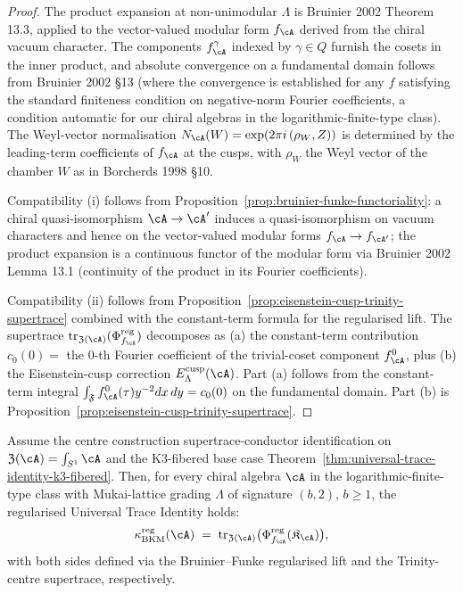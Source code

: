 \begin{proof}
The product expansion at non-unimodular $\Lambda$ is Bruinier 2002
Theorem 13.3, applied to the vector-valued modular form $f_\cA$ derived
from the chiral vacuum character. The components $f_\cA^\gamma$ indexed
by $\gamma \in Q$ furnish the cosets in the inner product, and
absolute convergence on a fundamental domain follows from Bruinier
2002 \S 13 \textup{(}where the convergence is established for any
$f$ satisfying the standard finiteness condition on negative-norm
Fourier coefficients, a condition automatic for our chiral algebras
in the logarithmic-finite-type class\textup{).} The Weyl-vector
normalisation $N_\cA(W) = \exp(2\pi i\,(\rho_W, Z))$ is determined by
the leading-term coefficients of $f_\cA$ at the cusps, with $\rho_W$
the Weyl vector of the chamber $W$ as in Borcherds 1998 \S 10.

Compatibility (i) follows from
Proposition~\ref{prop:bruinier-funke-functoriality}: a chiral
quasi-isomorphism $\cA \to \cA'$ induces a quasi-isomorphism on vacuum
characters and hence on the vector-valued modular forms
$f_\cA \to f_{\cA'}$; the product expansion is a continuous functor of
the modular form via Bruinier 2002 Lemma 13.1 \textup{(}continuity of
the product in its Fourier coefficients\textup{).}

Compatibility (ii) follows from
Proposition~\ref{prop:eisenstein-cusp-trinity-supertrace} combined with
the constant-term formula for the regularised lift. The supertrace
$\mathrm{tr}_{\mathfrak{Z}(\cA)}(\Phi^{\mathrm{reg}}_{f_\cA})$
decomposes as (a) the constant-term contribution
$c_0(0) = $ the $0$-th Fourier coefficient of the trivial-coset
component $f_\cA^0$, plus (b) the Eisenstein-cusp correction
$E_\Lambda^{\mathrm{cusp}}(\cA)$. Part (a) follows from the
constant-term integral $\int_{\mathfrak{F}} f_\cA^0(\tau) y^{-2} dx \, dy = c_0(0)$
on the fundamental domain. Part (b) is
Proposition~\ref{prop:eisenstein-cusp-trinity-supertrace}.
\end{proof}

\begin{theorem}
\label{thm:universal-trace-identity-non-k3-fibered}
Assume the centre construction supertrace-conductor identification on
$\mathfrak{Z}(\cA) = \int_{S^1}\cA$ and the K$3$-fibered base case
Theorem~\ref{thm:universal-trace-identity-k3-fibered}. Then, for every
chiral algebra $\cA$ in the logarithmic-finite-type class with
Mukai-lattice grading $\Lambda$ of signature $(b, 2)$, $b \ge 1$, the
regularised Universal Trace Identity holds:
\[
 \kappa_{\mathrm{BKM}}^{\mathrm{reg}}(\cA) \;=\; \mathrm{tr}_{\mathfrak{Z}(\cA)}\bigl(\Phi^{\mathrm{reg}}_{f_\cA}(\mathfrak{K}_\cA)\bigr),
\]
with both sides defined via the Bruinier--Funke regularised lift and
the Trinity-centre supertrace, respectively.
\end{theorem}


